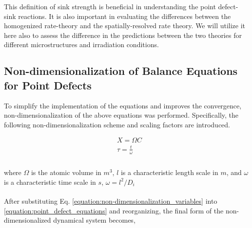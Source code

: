 \documentclass[utf8]{frontiersSCNS} %
\begin{document}
    This definition of sink strength is beneficial in understanding the point defect-sink reactions. It is also important in evaluating the differences between the homogenized rate-theory and the spatially-resolved rate theory. We will utilize it here also to assess the  difference in the predictions between the two theories for different microstructures and irradiation conditions.\\

\subsection{Non-dimensionalization of Balance Equations for Point Defects}
    To simplify the implementation of the equations and improves the convergence, non-dimensionalization of the above equations was performed. Specifically, the following non-dimensionalization scheme and scaling factors are introduced.
    
    \begin{equation}
      \begin{aligned}
        &X = \Omega C\\
        &\tau = \frac{t}{\omega}\\
      \end{aligned}
      \label{equation:non-dimensionalization_variables}
    \end{equation}\\
    where ${\Omega}$ is the atomic volume in ${m^3}$, ${l}$ is a characteristic length scale in ${m}$, and ${\omega}$ is a characteristic time scale in ${s}$, ${\omega= l^2/D_i}$\\
    \\
    After substituting Eq. \ref{equation:non-dimensionalization_variables} into \ref{equation:point_defect_equations} and reorganizing, the final form  of the non-dimensionalized dynamical system becomes,
    
\end{document}
